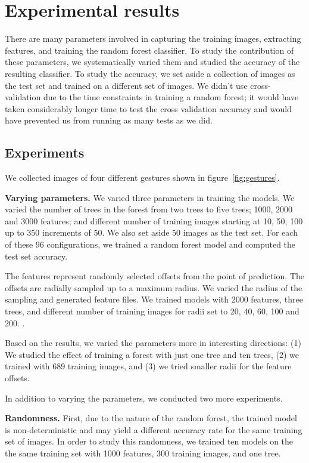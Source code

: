 \section{Experimental results}
There are many parameters involved in capturing the training images, extracting features, and training the random forest classifier. To study the contribution of these parameters, we systematically varied them and studied the accuracy of the resulting classifier. To study the accuracy, we set aside a collection of images as the test set and trained on a different set of images. We didn't use cross-validation due to the time constraints in training a random forest; it would have taken considerably longer time to test the cross validation accuracy and would  have prevented us from running as many tests as we did.

\subsection{Experiments}
We collected images of four different gestures shown in figure~\ref{fig:gestures}.

\textbf{Varying parameters.} We varied three parameters in training the models. We varied the number of trees in the forest from two trees to five trees; 1000, 2000 and 3000 features; and different number of training images starting at 10, 50, 100 up to 350 increments of 50. We also set aside 50 images as the test set. For each of these 96 configurations, we trained a random forest model and computed the test set accuracy.

The features represent randomly selected offsets from the point of prediction. The offsets are radially sampled up to a maximum radius. We varied the radius of the sampling and generated feature files. We trained models with 2000 features, three trees, and different number of training images for radii set to 20, 40, 60, 100 and 200. .

Based on the results, we varied the parameters more in interesting directions: (1) We studied the effect of training a forest with just one tree and ten trees, (2) we trained with 689 training images, and (3) we tried smaller radii for the feature offsets. 

In addition to varying the parameters, we conducted two more experiments. 

\textbf{Randomness.} First, due to the nature of the random forest, the trained model is non-deterministic and may yield a different accuracy rate for the same training set of images. In order to study this randomness, we trained ten models on the the same training set with 1000 features, 300 training images, and one tree. 

